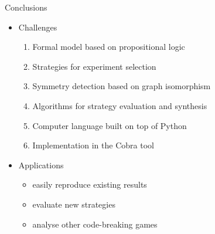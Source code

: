 \documentclass{beamer}
\begin{document}
\begin{frame}{Conclusions}
\begin{itemize}
\item Challenges
\begin{enumerate}[\checkmark]
\item Formal model based on propositional logic
\item Strategies for experiment selection
\item Symmetry detection based on graph isomorphism
\item Algorithms for strategy evaluation and synthesis
\item Computer language built on top of Python
\item Implementation in the Cobra tool
\end{enumerate}\bigskip\pause
\item Applications
\begin{itemize}
\item easily reproduce existing results
\item evaluate new strategies
\item analyse other code-breaking games
\end{itemize}
\end{itemize}
\end{frame}
\end{document}
